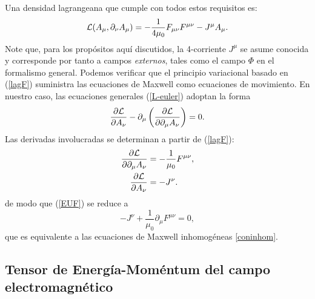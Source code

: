 Una densidad lagrangeana que cumple con todos estos requisitos es:
\begin{equation}
{\cal L}(A_\mu,\partial_\nu A_\mu) =-\frac{1}{4\mu_0}F_{\mu\nu}F^{\mu\nu}-J^\mu A_\mu .\label{lagF}
\end{equation}
Note que, para los propósitos aquí discutidos, la 4-corriente $J^\mu$ se asume
conocida y corresponde por tanto a campos \textit{externos}, tales como el campo
$\Phi$ en el formalismo general. Podemos verificar que el principio variacional
basado en (\ref{lagF}) suministra las ecuaciones de Maxwell como ecuaciones de
movimiento. En nuestro caso, las ecuaciones generales (\ref{L-euler}) adoptan la
forma
\begin{equation}
\frac{\partial{\cal L}}{\partial A_{\nu}}-\partial_\mu\left(  \frac
{\partial{\cal L}}{\partial\partial_\mu A_{\nu}}\right) =0. \label{EUF}
\end{equation}
Las derivadas involucradas se determinan a partir de (\ref{lagF}):
\begin{align}
\frac{\partial{\cal L}}{\partial\partial_\mu A_{\nu}}  & =-\frac{1}{\mu_0}F^{\mu\nu}, \label{dLdda}\\
\frac{\partial{\cal L}}{\partial A_{\nu}}  & =-J^\nu .
\end{align}
de modo que (\ref{EUF}) se reduce a
\begin{equation}
-J^\nu +\frac{1}{\mu_0}\partial_\mu F^{\mu\nu}=0,
\end{equation}
que es equivalente a las ecuaciones de Maxwell inhomogéneas \eqref{coninhom}.



\subsection{Tensor de Energía-Moméntum del campo electromagnético}

